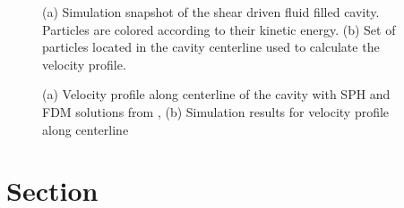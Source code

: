 \begin{figure}[ht]
\centering
  \begin{footnotesize}
  
  \caption[(a) Simulation snapshot of the shear driven fluid filled cavity. Particles are colored according to their kinetic energy. (b) Set of particles located in the cavity centerline used to calculate the velocity profile.]{(a) Simulation snapshot of the shear driven fluid filled cavity. Particles are colored according to their kinetic energy. (b) Set of particles located in the cavity centerline used to calculate the velocity profile.}
  \label{fig:Bild1}
  \end{footnotesize}
\end{figure} 



\begin{figure}[H]
\centering
  \begin{footnotesize}
  
  \caption[(a) Velocity profile along centerline of the cavity with SPH and FDM solutions from \cite{neece_tait_1968} , (b) Simulation results for velocity profile along centerline ]{(a) Velocity profile along centerline of the cavity with SPH and FDM solutions from \cite{neece_tait_1968} , (b) Simulation results for velocity profile along centerline }
  \label{fig:Bild2}
  \end{footnotesize}
\end{figure} 



\section{Section}
\label{sec:section 2}


